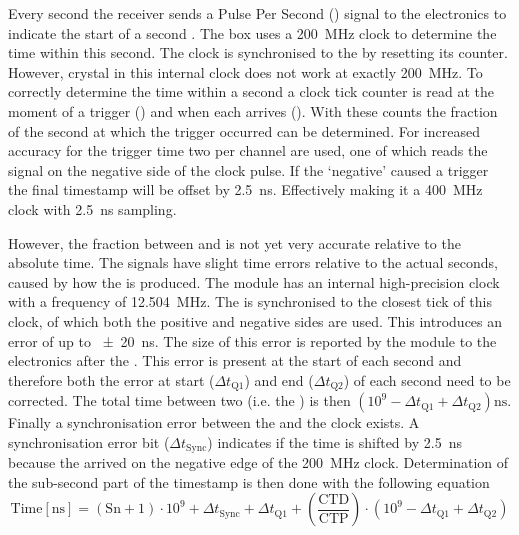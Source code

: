 Every second the \gps receiver sends a Pulse Per Second (\pps) signal to the \hisparc electronics to indicate the start of a second \cite{verkooijen2008firmware}. The \hisparc box uses a \SI{200}{\mega\hertz} clock to determine the time within this second. The clock is synchronised to the \pps by resetting its counter. However, crystal in this internal clock does not work at exactly \SI{200}{\mega\hertz}. To correctly determine the time within a second a clock tick counter is read at the moment of a trigger (\ctd) and when each \pps arrives (\ctp). With these counts the fraction of the second at which the trigger occurred can be determined. For increased accuracy for the trigger time two \adcs per channel are used, one of which reads the signal on the negative side of the clock pulse. If the `negative' \adc caused a trigger the final timestamp will be offset by \SI{2.5}{\ns}. Effectively making it a \SI{400}{\mega\hertz} clock with \SI{2.5}{\ns} sampling.

However, the fraction between \ctd and \ctp is not yet very accurate relative to the absolute \gps time. The \pps signals have slight time errors relative to the actual \gps seconds, caused by how the \pps is produced. The \gps module has an internal high-precision clock with a frequency of  \SI{12.504}{\mega\hertz}. The \pps is synchronised to the closest tick of this clock, of which both the positive and negative sides are used. This introduces an error of up to \SI{\pm 20}{\ns}. The size of this error is reported by the \gps module to the electronics after the \pps. This error is present at the start of each second and therefore both the error at start ($\Delta t_{\mathrm{Q1}}$) and end ($\Delta t_{\mathrm{Q2}}$) of each second need to be corrected. The total time between two \pps (i.e. the \ctp) is then $(10^9 - \Delta t_{\mathrm{Q1}} + \Delta t_{\mathrm{Q2}}) \si{\ns}$. Finally a synchronisation error between the \pps and the \hisparc clock exists. A synchronisation error bit ($\Delta t_{\mathrm{Sync}}$) indicates if the time is shifted by \SI{2.5}{\ns} because the \pps arrived on the negative edge of the \SI{200}{\mega\hertz} clock. Determination of the sub-second part of the timestamp is then done with the following equation
%
\begin{equation}
\label{eq:timestamp}
   \mathrm{Time[\si{\ns}]} =
      (\mathrm{Sn} + 1) \cdot 10^9 +
      \Delta t_{\mathrm{Sync}} + \Delta t_{\mathrm{Q1}} +
      \left(\frac{\mathrm{CTD}}{\mathrm{CTP}}\right) \cdot
      \left(10^9 - \Delta t_{\mathrm{Q1}} + \Delta t_{\mathrm{Q2}}\right)
\end{equation}


